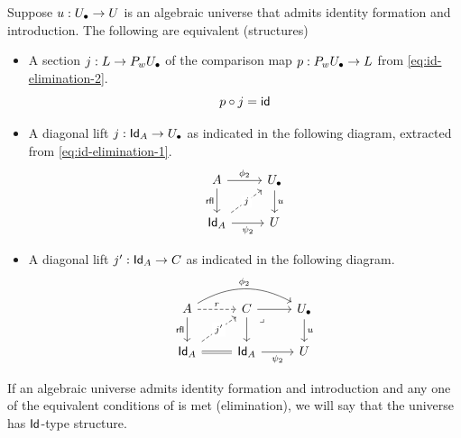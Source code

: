 \begin{proposition}\label{prop:id-elim-equiv}
  Suppose ${u} : {U_\bullet} \to U$ is an algebraic universe that admits
  identity formation and introduction.
  The following are equivalent (structures)
  \begin{itemize}
    \item A section $j : L \to P_{{w}} {U_\bullet}$
    of the comparison map $p : P_{{w}} {U_\bullet} \to L$
    from \cref{eq:id-elimination-2}.
    \[ p \circ j = \mathsf{id}\]
    \item A diagonal lift $j : \mathsf{Id}_{A} \to {U_\bullet}$
    as indicated in the following diagram,
    extracted from \cref{eq:id-elimination-1}.
    \[\begin{tikzcd}
        {{A}} & \Ulow \\
        {\Id_A} & \U
        \arrow["{{\phi_2}}", from=1-1, to=1-2]
        \arrow["{{\rfl}}"', from=1-1, to=2-1]
        \arrow["\uu", from=1-2, to=2-2]
        \arrow["j"{description}, dashed, from=2-1, to=1-2]
        \arrow["{{\psi_2}}"', from=2-1, to=2-2]
      \end{tikzcd}\]
    \item A diagonal lift $j' : \mathsf{Id}_{A} \to C$
    as indicated in the following diagram.
    \[\begin{tikzcd}
        {{A}} & C & \Ulow \\
        {\Id_{A}} & {\Id_{A}} & \U
        \arrow["r", dashed, from=1-1, to=1-2]
        \arrow["{{{\phi_2}}}", bend left, from=1-1, to=1-3]
        \arrow["{{{\rfl}}}"', from=1-1, to=2-1]
        \arrow[from=1-2, to=1-3]
        \arrow[from=1-2, to=2-2]
        \arrow["\lrcorner"{anchor=center, pos=0.125}, draw=none, from=1-2, to=2-3]
        \arrow["\uu", from=1-3, to=2-3]
        \arrow["{j'}"{description}, dashed, from=2-1, to=1-2]
        \arrow[equals, from=2-1, to=2-2]
        \arrow["{{{\psi_2}}}"', from=2-2, to=2-3]
      \end{tikzcd}\]
  \end{itemize}
\end{proposition}

\begin{definition}[$\Id$-types]\label{def:algebraic-id-types}
  If an algebraic universe admits identity formation and introduction and
  any one of the equivalent conditions of  is met (elimination),
  we will say that the universe has $\Id$-type structure.
\end{definition}


